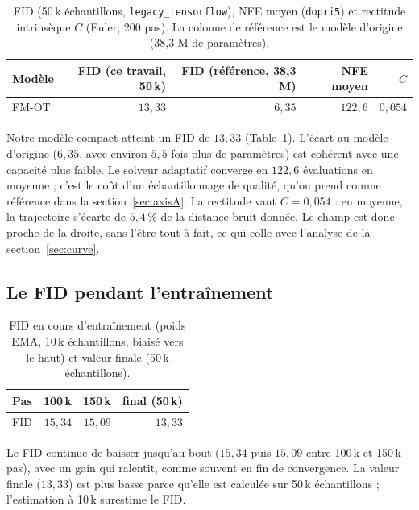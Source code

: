 \documentclass[11pt]{article}
\newcommand{\code}[1]{\texttt{#1}}
\begin{document}
\begin{table}[htbp]
\centering
\caption{FID (50\,k échantillons, \code{legacy\_tensorflow}), NFE moyen (\code{dopri5}) et rectitude
intrinsèque $C$ (Euler, 200 pas). La colonne de référence est le modèle d'origine (38,3 M de paramètres).}
\label{tab:table1}
\begin{tabular}{@{}lrrrr@{}}
\toprule
Modèle & FID (ce travail, 50\,k) & FID (référence, 38,3 M) & NFE moyen & $C$ \\
\midrule
FM-OT & $13{,}33$ & $6{,}35$ & $122{,}6$ & $0{,}054$ \\
\bottomrule
\end{tabular}
\end{table}

Notre modèle compact atteint un FID de $13{,}33$ (Table~\ref{tab:table1}). L'écart au modèle d'origine
($6{,}35$, avec environ $5{,}5$ fois plus de paramètres) est cohérent avec une capacité plus faible. Le
solveur adaptatif converge en $122{,}6$ évaluations en moyenne ; c'est le coût d'un échantillonnage de
qualité, qu'on prend comme référence dans la section~\ref{sec:axisA}. La rectitude vaut $C = 0{,}054$ : en
moyenne, la trajectoire s'écarte de $5{,}4\,\%$ de la distance bruit-donnée. Le champ est donc proche de la
droite, sans l'être tout à fait, ce qui colle avec l'analyse de la section~\ref{sec:curve}.

\subsection{Le FID pendant l'entraînement}

\begin{table}[htbp]
\centering
\caption{FID en cours d'entraînement (poids EMA, 10\,k échantillons, biaisé vers le haut) et valeur finale
(50\,k échantillons).}
\label{tab:fid-train}
\begin{tabular}{@{}lrrr@{}}
\toprule
Pas & 100\,k & 150\,k & final (50\,k) \\
\midrule
FID & $15{,}34$ & $15{,}09$ & $13{,}33$ \\
\bottomrule
\end{tabular}
\end{table}

Le FID continue de baisser jusqu'au bout ($15{,}34$ puis $15{,}09$ entre 100\,k et 150\,k pas), avec un gain
qui ralentit, comme souvent en fin de convergence. La valeur finale ($13{,}33$) est plus basse parce qu'elle
est calculée sur 50\,k échantillons ; l'estimation à 10\,k surestime le FID.
\end{document}
